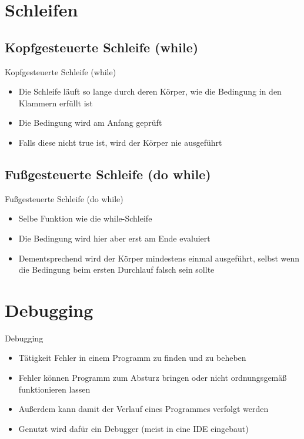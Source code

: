 \section{Schleifen}
\subsection{Kopfgesteuerte Schleife (while)}
\begin{frame}{Kopfgesteuerte Schleife (while)}
	\begin{itemize}
		\item Die Schleife läuft so lange durch deren Körper, wie die Bedingung in den Klammern erfüllt ist
		\item Die Bedingung wird am Anfang geprüft
		\item Falls diese nicht \alert{true} ist, wird der Körper nie ausgeführt
	\end{itemize}
		
\end{frame}

\subsection{Fußgesteuerte Schleife (do while)}
\begin{frame}{Fußgesteuerte Schleife (do while)}
	\begin{itemize}
		\item Selbe Funktion wie die while-Schleife
		\item Die Bedingung wird hier aber erst am Ende evaluiert
		\item Dementsprechend wird der Körper mindestens einmal ausgeführt, selbst wenn die Bedingung beim ersten Durchlauf falsch sein sollte
	\end{itemize}
		
\end{frame}

\section{Debugging}
\begin{frame}{Debugging}
	\begin{itemize}
		\item Tätigkeit Fehler in einem Programm zu finden und zu beheben
		\item Fehler können Programm zum Absturz bringen oder nicht ordnungsgemäß funktionieren lassen
		\item Außerdem kann damit der Verlauf eines Programmes verfolgt werden
	\end{itemize}
	\begin{itemize}
		\item Genutzt wird dafür ein Debugger (meist in eine IDE eingebaut)
	\end{itemize}
\end{frame}

